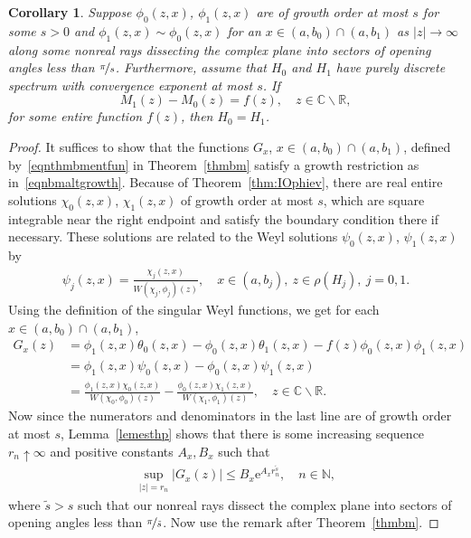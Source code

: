 \documentclass{amsart}
\newtheorem{corollary}[theorem]{Corollary}
\numberwithin{equation}{section}
\begin{document}
\begin{corollary}\label{corbmdis}
Suppose $\phi_0(z,x)$, $\phi_1(z,x)$ are of growth order at most $s$ for some $s>0$ and  $\phi_1(z,x) \sim \phi_0(z,x)$ for an $x\in(a,b_0)\cap(a,b_1)$ as $|z|\to\infty$ along some nonreal rays dissecting the complex plane into sectors of opening angles less than $\nicefrac{\pi}{s}$.
Furthermore, assume that $H_0$ and $H_1$ have purely discrete spectrum with convergence exponent at most $s$.
If 
\begin{equation}
 M_1(z) - M_0(z) = f(z), \quad z\in{{\mathbb C}}\backslash{{\mathbb R}},
\end{equation}
for some entire function $f(z)$, then $H_0=H_1$.
\end{corollary}

\begin{proof}
 It suffices to show that the functions $G_x$, $x\in(a,b_0)\cap(a,b_1)$, defined by~\eqref{eqnthmbmentfun} in Theorem~\ref{thmbm} satisfy a growth restriction as in~\eqref{eqnbmaltgrowth}.
 Because of Theorem~\ref{thm:IOphiev}, there are real entire solutions $\chi_0(z,x)$, $\chi_1(z,x)$ of growth order at most $s$, which are square integrable near the right endpoint and satisfy the boundary condition there if necessary.
 These solutions are related to the Weyl solutions $\psi_0(z,x)$, $\psi_1(z,x)$ by
 \begin{align*}
  \psi_j(z,x) = \frac{\chi_j(z,x)}{W(\chi_j,\phi_j)(z)}, \quad x\in(a,b_j),~ z\in\rho(H_j),~ j=0,1.
 \end{align*}
 Using the definition of the singular Weyl functions, we get for each $x\in(a,b_0)\cap(a,b_1)$, 
 \begin{align*}
G_x(z) & = \phi_1(z,x)  \theta_0(z,x) - \phi_0(z,x) \theta_1(z,x) - f(z)\phi_0(z,x) \phi_1(z,x) \\
 & = \phi_1(z,x) \psi_0(z,x) - \phi_0(z,x) \psi_1(z,x) \\
 & = \frac{\phi_1(z,x) \chi_0(z,x)}{W(\chi_0,\phi_0)(z)} - \frac{\phi_0(z,x) \chi_1(z,x)}{W(\chi_1,\phi_1)(z)}, \quad z\in{{\mathbb C}}\backslash{{\mathbb R}}.
\end{align*}
 Now since the numerators and denominators in the last line are of growth order at most $s$, Lemma~\ref{lemesthp} shows that there is some increasing sequence $r_n\uparrow\infty$ and positive constants $A_x, B_x$ such that 
\begin{align*}
 \sup_{|z|=r_n} |G_x(z)| \leq B_x {\mathrm{e}}^{A_x r_n^{\tilde{s}}}, \quad n\in{{\mathbb N}},
\end{align*}
where $\tilde{s}>s$ such that our nonreal rays dissect the complex plane into sectors of opening angles less than $\nicefrac{\pi}{\tilde{s}}$.
Now use the remark after Theorem~\ref{thmbm}.
\end{proof}
\end{document}
